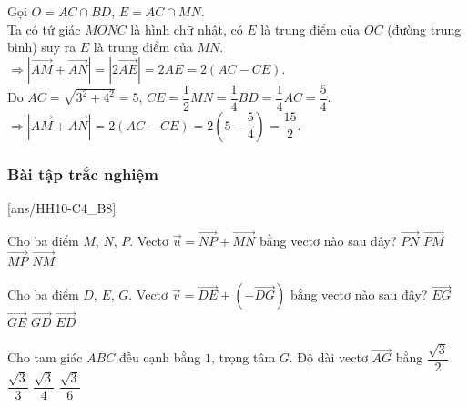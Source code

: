 \begin{bt}
{\begin{listEX}
			Gọi $O=AC\cap BD$, $E=AC\cap MN$.\\
			Ta có tứ giác $MONC$ là hình chữ nhật, có $E$ là trung điểm của $OC$ (đường trung bình) suy ra $E$ là trung điểm của $MN$.\\
			$\Rightarrow \left|\overrightarrow{AM}+\overrightarrow{AN}\right|=\left|2\overrightarrow{AE}\right|=2AE=2(AC-CE)$.\\
			Do $AC=\sqrt{3^2+4^2}=5$, $CE=\dfrac{1}{2}MN=\dfrac{1}{4}BD=\dfrac{1}{4}AC=\dfrac{5}{4}$.\\
			$\Rightarrow \left|\overrightarrow{AM}+\overrightarrow{AN}\right|=2(AC-CE)=2\left(5-\dfrac{5}{4}\right)=\dfrac{15}{2}$.
		\end{listEX}
	}
\end{bt}

\subsubsection{Bài tập trắc nghiệm}
[ans/HH10-C4_B8]

\begin{ex}%
	Cho ba điểm $M$, $N$, $P$. Vectơ $\vec{u}=\overrightarrow{NP}+\overrightarrow{MN}$ bằng vectơ nào sau đây?
	\choice
	{$\overrightarrow{PN}$}
	{$\overrightarrow{PM}$}
	{\True $\overrightarrow{MP}$}
	{$\overrightarrow{NM}$}
\end{ex}

\begin{ex}%
	Cho ba điểm $D$, $E$, $G$. Vectơ $\overrightarrow{v}=\overrightarrow{DE}+(-\overrightarrow{DG})$ bằng vectơ nào sau đây?
	\choice
	{$\overrightarrow{EG}$}
	{\True$\overrightarrow{GE}$}
	{$\overrightarrow{GD}$}
	{$\overrightarrow{ED}$}
\end{ex}
\begin{ex}%
	Cho tam giác $ABC$ đều cạnh bằng $1$, trọng tâm $G$. Độ dài vectơ $\overrightarrow{AG}$ bằng
	\choice
	{$\dfrac{\sqrt{3}}{2}$}
	{\True $\dfrac{\sqrt{3}}{3}$}
	{$\dfrac{\sqrt{3}}{4}$}
	{$\dfrac{\sqrt{3}}{6}$}
\end{ex}

